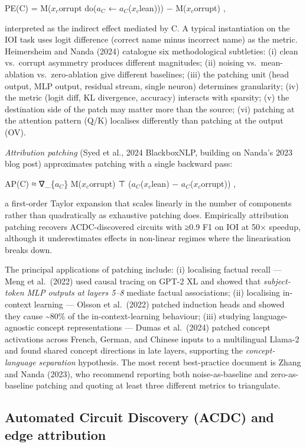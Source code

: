 PE(C) = M(\(x_c\)orrupt \textbar{} do(\(a_C\) ← \(a_C\)(\(x_c\)lean))) − M(\(x_c\)orrupt) ,

interpreted as the indirect effect mediated by C. A typical instantiation on the IOI task uses logit difference (correct name minus incorrect name) as the metric. Heimersheim and Nanda (2024) catalogue six methodological subtleties: (i) clean vs.~corrupt asymmetry produces different magnitudes; (ii) noising vs.~mean-ablation vs.~zero-ablation give different baselines; (iii) the patching unit (head output, MLP output, residual stream, single neuron) determines granularity; (iv) the metric (logit diff, KL divergence, accuracy) interacts with sparsity; (v) the destination side of the patch may matter more than the source; (vi) patching at the attention pattern (Q/K) localises differently than patching at the output (OV).

\emph{Attribution patching} (Syed et al., 2024 BlackboxNLP, building on Nanda's 2023 blog post) approximates patching with a single backward pass:

AP(C) ≈ ∇\_\{\(a_C\)\} M(\(x_c\)orrupt) ⊤ (\(a_C\)(\(x_c\)lean) − \(a_C\)(\(x_c\)orrupt)) ,

a first-order Taylor expansion that scales linearly in the number of components rather than quadratically as exhaustive patching does. Empirically attribution patching recovers ACDC-discovered circuits with ≥0.9 F1 on IOI at 50× speedup, although it underestimates effects in non-linear regimes where the linearisation breaks down.

The principal applications of patching include: (i) localising factual recall --- Meng et al.~(2022) used causal tracing on GPT-2 XL and showed that \emph{subject-token MLP outputs at layers 5--8} mediate factual associations; (ii) localising in-context learning --- Olsson et al.~(2022) patched induction heads and showed they cause \textasciitilde80\% of the in-context-learning behaviour; (iii) studying language-agnostic concept representations --- Dumas et al.~(2024) patched concept activations across French, German, and Chinese inputs to a multilingual Llama-2 and found shared concept directions in late layers, supporting the \emph{concept-language separation} hypothesis. The most recent best-practice document is Zhang and Nanda (2023), who recommend reporting both noise-as-baseline and zero-as-baseline patching and quoting at least three different metrics to triangulate.

\subsection{Automated Circuit Discovery (ACDC) and edge attribution}\label{automated-circuit-discovery-acdc-and-edge-attribution}

